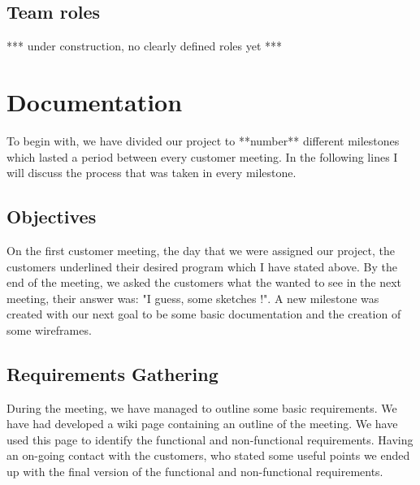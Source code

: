 \documentclass{l3proj}
\begin{document}
\subsection{Team roles}
\label{roles}
*** under construction, no clearly defined roles yet ***
 






\section{Documentation}
\label{documentation}

To begin with, we have divided our project to **number** different milestones which lasted a period between every customer meeting. In the following lines I will discuss the process that was taken in every milestone.

\subsection{Objectives}
\label{objectives} 

On the first customer meeting, the day that we were assigned our project, the customers underlined their desired program which I have stated above. By the end of the meeting, we asked the customers what the wanted to see in the next meeting, their answer was: "I guess, some sketches !". A new milestone was created with our next goal to be some basic documentation and the creation of some wireframes.

\subsection{Requirements Gathering}
\label{requirements}

During the meeting, we have managed to outline some basic requirements. We have had developed a wiki page containing an outline of the meeting. We have used this page to identify the functional and non-functional requirements. Having an on-going contact with the customers, who stated some useful points we ended up with the final version of the functional and non-functional requirements. 
\end{document}
